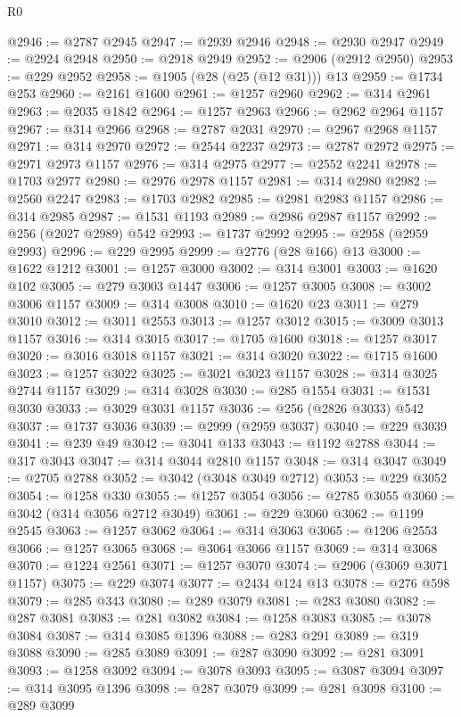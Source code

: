 \begin{lexlean}{R0}
\begin{coremodule}
@2946 := @2787 @2945
@2947 := @2939 @2946
@2948 := @2930 @2947
@2949 := @2924 @2948
@2950 := @2918 @2949
@2952 := @2906 (@2912 @2950)
@2953 := @229 @2952
@2958 := @1905 (@28 (@25 (@12 @31))) @13
@2959 := @1734 @253
@2960 := @2161 @1600
@2961 := @1257 @2960
@2962 := @314 @2961
@2963 := @2035 @1842
@2964 := @1257 @2963
@2966 := @2962 @2964 @1157
@2967 := @314 @2966
@2968 := @2787 @2031
@2970 := @2967 @2968 @1157
@2971 := @314 @2970
@2972 := @2544 @2237
@2973 := @2787 @2972
@2975 := @2971 @2973 @1157
@2976 := @314 @2975
@2977 := @2552 @2241
@2978 := @1703 @2977
@2980 := @2976 @2978 @1157
@2981 := @314 @2980
@2982 := @2560 @2247
@2983 := @1703 @2982
@2985 := @2981 @2983 @1157
@2986 := @314 @2985
@2987 := @1531 @1193
@2989 := @2986 @2987 @1157
@2992 := @256 (@2027 @2989) @542
@2993 := @1737 @2992
@2995 := @2958 (@2959 @2993)
@2996 := @229 @2995
@2999 := @2776 (@28 @166) @13
@3000 := @1622 @1212
@3001 := @1257 @3000
@3002 := @314 @3001
@3003 := @1620 @102
@3005 := @279 @3003 @1447
@3006 := @1257 @3005
@3008 := @3002 @3006 @1157
@3009 := @314 @3008
@3010 := @1620 @23
@3011 := @279 @3010
@3012 := @3011 @2553
@3013 := @1257 @3012
@3015 := @3009 @3013 @1157
@3016 := @314 @3015
@3017 := @1705 @1600
@3018 := @1257 @3017
@3020 := @3016 @3018 @1157
@3021 := @314 @3020
@3022 := @1715 @1600
@3023 := @1257 @3022
@3025 := @3021 @3023 @1157
@3028 := @314 @3025 @2744 @1157
@3029 := @314 @3028
@3030 := @285 @1554
@3031 := @1531 @3030
@3033 := @3029 @3031 @1157
@3036 := @256 (@2826 @3033) @542
@3037 := @1737 @3036
@3039 := @2999 (@2959 @3037)
@3040 := @229 @3039
@3041 := @239 @49
@3042 := @3041 @133
@3043 := @1192 @2788
@3044 := @317 @3043
@3047 := @314 @3044 @2810 @1157
@3048 := @314 @3047
@3049 := @2705 @2788
@3052 := @3042 (@3048 @3049 @2712)
@3053 := @229 @3052
@3054 := @1258 @330
@3055 := @1257 @3054
@3056 := @2785 @3055
@3060 := @3042 (@314 @3056 @2712 @3049)
@3061 := @229 @3060
@3062 := @1199 @2545
@3063 := @1257 @3062
@3064 := @314 @3063
@3065 := @1206 @2553
@3066 := @1257 @3065
@3068 := @3064 @3066 @1157
@3069 := @314 @3068
@3070 := @1224 @2561
@3071 := @1257 @3070
@3074 := @2906 (@3069 @3071 @1157)
@3075 := @229 @3074
@3077 := @2434 @124 @13
@3078 := @276 @598
@3079 := @285 @343
@3080 := @289 @3079
@3081 := @283 @3080
@3082 := @287 @3081
@3083 := @281 @3082
@3084 := @1258 @3083
@3085 := @3078 @3084
@3087 := @314 @3085 @1396
@3088 := @283 @291
@3089 := @319 @3088
@3090 := @285 @3089
@3091 := @287 @3090
@3092 := @281 @3091
@3093 := @1258 @3092
@3094 := @3078 @3093
@3095 := @3087 @3094
@3097 := @314 @3095 @1396
@3098 := @287 @3079
@3099 := @281 @3098
@3100 := @289 @3099

\end{coremodule}
\end{lexlean}
